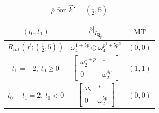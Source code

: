 \documentclass[11pt]{amsart}
\theoremstyle{definition}
\numberwithin{equation}{subsection}
\theoremstyle{plain}
\theoremstyle{plain}
\theoremstyle{plain}
\theoremstyle{plain}
\theoremstyle{plain}
\theoremstyle{plain}
\theoremstyle{plain}
\theoremstyle{plain}
\theoremstyle{plain}
\theoremstyle{plain}
\theoremstyle{plain}
\theoremstyle{plain}
\theoremstyle{definition}
\theoremstyle{definition}
\theoremstyle{definition}
\theoremstyle{remark}
\renewcommand{\(}{\textup{(}}
\renewcommand{\)}{\textup{)}}
\newcommand{\Q}{\mathbf{Q}}
\newcommand{\rhobar}{\overline{\rho}}
\newcommand{\vr}{\vec{r}}
\newcommand{\vk}{\vec{k}}
\begin{document}
\begin{table}[htbp]%
  \centering
  \begin{tabular}{|c||c|c|}
    \hline
    $(t_0,t_1)$ & $\rhobar|_{I_{\Q_{p^2}}}$ & $\vec{\mathrm{MT}}$ \\\hline\hline
    $R_{int}(\vr;(\frac{1}{2},5))$
      & $\omega_4^{1+5p}\oplus\omega_4^{p^2+5p^3}$ & $(0,0)$ \\\hline
    $t_1=-2$, $t_0\geq 0$
      & $
      \begin{bmatrix}
        \omega_2^{1+p} & * \\
        0 & \omega_2^{4p}
      \end{bmatrix}$ & $(1,1)$ \\\hline
    $t_0-t_1=2$, $t_0<0$
      & $
      \begin{bmatrix}
        \omega_2 & * \\
        0 & \omega_2^{5p}
      \end{bmatrix}$ & $(0,0)$ \\\hline
  \end{tabular}
  \caption{$\rhobar$ for $\vk'=(\frac{1}{2},5)$}\label{tab: (1/2,5)}
\end{table}
\end{document}
